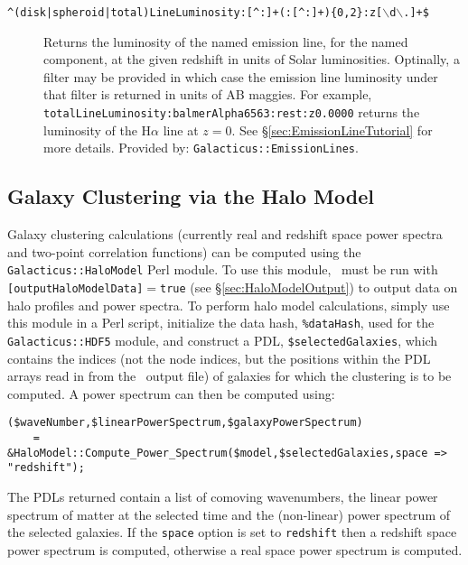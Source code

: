 \begin{description}
 \item[{\tt \textasciicircum (disk|spheroid|total)LineLuminosity:[\textasciicircum:]+(:[\textasciicircum:]+)\{0,2\}:z[$\backslash$d$\backslash$.]+\$}] Returns the luminosity of the named emission line, for the named component, at the given redshift in units of Solar luminosities. Optinally, a filter may be provided in which case the emission line luminosity under that filter is returned in units of AB \glspl{maggie}. For example, {\tt totalLineLuminosity:balmerAlpha6563:rest:z0.0000} returns the luminosity of the H$\alpha$ line at $z=0$. See \S\ref{sec:EmissionLineTutorial} for more details. Provided by: {\tt Galacticus::EmissionLines}. 
\end{description}

\subsection{Galaxy Clustering via the Halo Model}\label{sec:ClusteringHaloModel}

Galaxy clustering calculations (currently real and redshift space power spectra and two-point correlation functions) can be computed using the {\tt Galacticus::HaloModel} Perl module. To use this module, \glc\ must be run with {\tt [outputHaloModelData]}$=${\tt true} (see \S\ref{sec:HaloModelOutput}) to output data on halo profiles and power spectra. To perform halo model calculations, simply use this module in a Perl script, initialize the data hash, {\tt \%dataHash}, used for the {\tt Galacticus::HDF5} module, and construct a PDL, {\tt \$selectedGalaxies}, which contains the indices (not the node indices, but the positions within the PDL arrays read in from the \glc\ output file) of galaxies for which the clustering is to be computed. A power spectrum can then be computed using:
\begin{verbatim}
($waveNumber,$linearPowerSpectrum,$galaxyPowerSpectrum) 
    = &HaloModel::Compute_Power_Spectrum($model,$selectedGalaxies,space => "redshift");
\end{verbatim}
The PDLs returned contain a list of comoving wavenumbers, the linear power spectrum of matter at the selected time and the (non-linear) power spectrum of the selected galaxies. If the {\tt space} option is set to {\tt redshift} then a redshift space power spectrum is computed, otherwise a real space power spectrum is computed.

